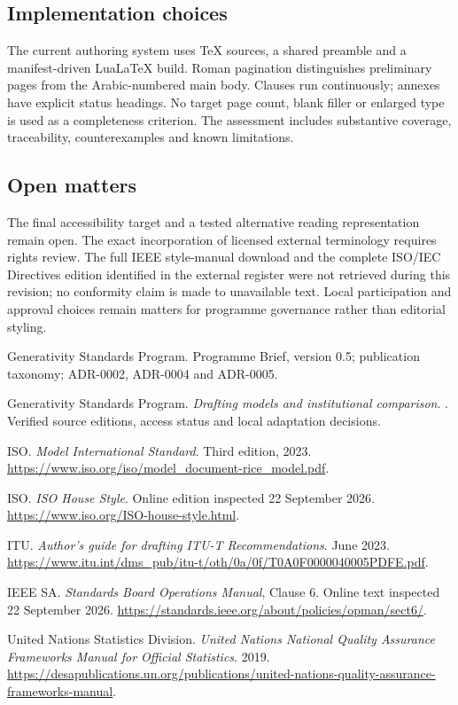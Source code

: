 \documentclass[11pt,a4paper]{article}
\begin{document}
\subsection{Implementation choices}
The current authoring system uses TeX sources, a shared preamble and a manifest-driven LuaLaTeX build. Roman pagination distinguishes preliminary pages from the Arabic-numbered main body. Clauses run continuously; annexes have explicit status headings. No target page count, blank filler or enlarged type is used as a completeness criterion. The assessment includes substantive coverage, traceability, counterexamples and known limitations.

\subsection{Open matters}
The final accessibility target and a tested alternative reading representation remain open. The exact incorporation of licensed external terminology requires rights review. The full IEEE style-manual download and the complete ISO/IEC Directives edition identified in the external register were not retrieved during this revision; no conformity claim is made to unavailable text. Local participation and approval choices remain matters for programme governance rather than editorial styling.

\GSPbibliography
\begin{enumerate}[label={[\arabic*]}]
\item Generativity Standards Program. Programme Brief, version 0.5; publication taxonomy; ADR-0002, ADR-0004 and ADR-0005.
\item Generativity Standards Program. \emph{Drafting models and institutional comparison}. . Verified source editions, access status and local adaptation decisions.
\item ISO. \emph{Model International Standard}. Third edition, 2023. \url{https://www.iso.org/iso/model_document-rice_model.pdf}.
\item ISO. \emph{ISO House Style}. Online edition inspected 22 September 2026. \url{https://www.iso.org/ISO-house-style.html}.
\item ITU. \emph{Author's guide for drafting ITU-T Recommendations}. June 2023. \url{https://www.itu.int/dms_pub/itu-t/oth/0a/0f/T0A0F0000040005PDFE.pdf}.
\item IEEE SA. \emph{Standards Board Operations Manual}, Clause 6. Online text inspected 22 September 2026. \url{https://standards.ieee.org/about/policies/opman/sect6/}.
\item United Nations Statistics Division. \emph{United Nations National Quality Assurance Frameworks Manual for Official Statistics}. 2019. \url{https://desapublications.un.org/publications/united-nations-quality-assurance-frameworks-manual}.
\end{enumerate}
\end{document}
